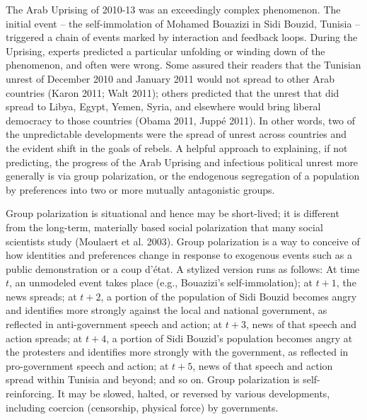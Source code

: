 \documentclass[12pt]{article}
\begin{document}
	The Arab Uprising of 2010-13 was an exceedingly complex phenomenon.  The initial event – the self-immolation of Mohamed Bouazizi in Sidi Bouzid, Tunisia – triggered a chain of events marked by interaction and feedback loops.  During the Uprising, experts predicted a particular unfolding or winding down of the phenomenon, and often were wrong.  Some assured their readers that the Tunisian unrest of December 2010 and January 2011 would not spread to other Arab countries (Karon 2011; Walt 2011); others predicted that the unrest that did spread to Libya, Egypt, Yemen, Syria, and elsewhere would bring liberal democracy to those countries (Obama 2011, Jupp\'{e} 2011).  In other words, two of the unpredictable developments were the spread of unrest across countries and the evident shift in the goals of rebels.  
A helpful approach to explaining, if not predicting, the progress of the Arab Uprising and infectious political unrest more generally is via group polarization, or the endogenous segregation of a population by preferences into two or more mutually antagonistic groups.  

Group polarization is situational and hence may be short-lived; it is different from the long-term, materially based social polarization that many social scientists study (Moulaert et al. 2003).  Group polarization is a way to conceive of how identities and preferences change in response to exogenous events such as a public demonstration or a coup d'\'{e}tat.  A stylized version runs as follows:  At time $t$, an unmodeled event takes place (e.g., Bouazizi's self-immolation); at $t+1$, the news spreads; at $t+2$, a portion of the population of Sidi Bouzid becomes angry and identifies more strongly against the local and national government, as reflected in anti-government speech and action; at $t+3$, news of that speech and action spreads; at $t+4$, a portion of Sidi Bouzid's population becomes angry at the protesters and identifies more strongly with the government, as reflected in pro-government speech and action; at $t+5$, news of that speech and action spread within Tunisia and beyond; and so on.  Group polarization is self-reinforcing.  It may be slowed, halted, or reversed by various developments, including coercion (censorship, physical force) by governments.
\end{document}
